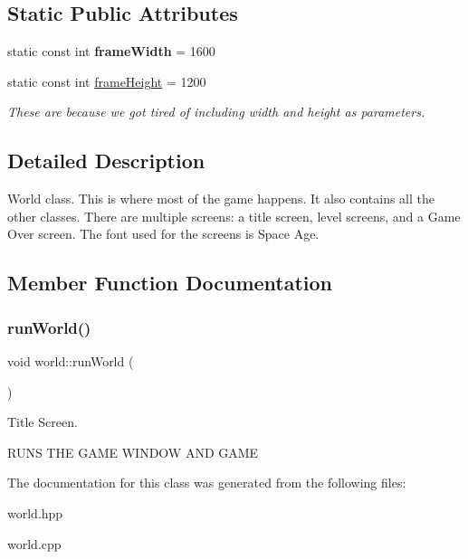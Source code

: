 \subsection*{Static Public Attributes}
\begin{DoxyCompactItemize}
\item 
\mbox{\label{classworld_a7c3026c923adae3c26180a7720501e1f}} 
static const int {\bfseries frame\+Width} = 1600
\item 
\mbox{\label{classworld_a8f337353f05737a695e4b03e6bf19a34}} 
static const int \hyperlink{classworld_a8f337353f05737a695e4b03e6bf19a34}{frame\+Height} = 1200
\begin{DoxyCompactList}\small\item\em These are because we got tired of including width and height as parameters. \end{DoxyCompactList}\end{DoxyCompactItemize}


\subsection{Detailed Description}
World class. This is where most of the game happens. It also contains all the other classes. There are multiple screens\+: a title screen, level screens, and a Game Over screen. The font used for the screens is Space Age. 

\subsection{Member Function Documentation}
\mbox{\label{classworld_a5347c4a6636fec585a64e3c730dd0e5b}} 
\subsubsection{\texorpdfstring{run\+World()}{runWorld()}}
{\footnotesize\ttfamily void world\+::run\+World (\begin{DoxyParamCaption}{ }\end{DoxyParamCaption})}



Title Screen. 

R\+U\+NS T\+HE G\+A\+ME W\+I\+N\+D\+OW A\+ND G\+A\+ME 

The documentation for this class was generated from the following files\+:\begin{DoxyCompactItemize}
\item 
world.\+hpp\item 
world.\+cpp\end{DoxyCompactItemize}
